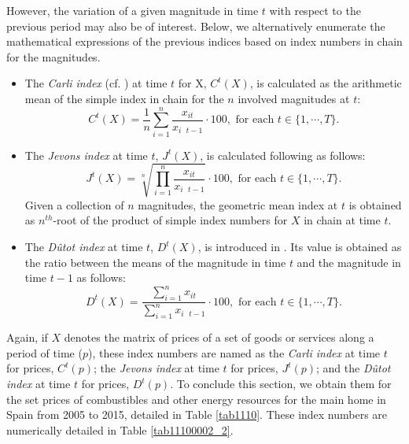 However,  the variation of a given magnitude in time $t$ with respect to  the previous period may also be  of interest. Below, we alternatively enumerate the mathematical  expressions of the previous indices based on index numbers in chain for the magnitudes.

\begin{itemize}
	\item The \emph{Carli index} (cf. \citealp{carli1804}) at time $t$ for X, $C^t(X)$, is calculated as the arithmetic mean of the simple index in chain for the $n$ involved magnitudes at $t$:
	\begin{equation}\label{niCarli}C^t(X)=\frac{1}{n}\sum_{i=1}^n \frac{x_{it}}{x_{i\mbox{ }t-1}}\cdot 100,\mbox{ for each }t\in\{1,\cdots,T\}.\end{equation}
	\item The \emph{Jevons index} at time $t$, $J^t(X)$, is calculated following \cite{jevons1863serious} as follows:
	\begin{equation}\label{niJevons}J^t(X)=\sqrt[n]{\prod_{i=1}^n \frac{x_{it}}{x_{i\mbox{ }t-1}}}\cdot 100,\mbox{ for each }t\in\{1,\cdots,T\}.\end{equation}
	Given a collection of $n$ magnitudes, the geometric mean index at $t$ is obtained as $n^{th}$-root of the product of simple index numbers for $X$ in chain at time $t$.
	\item The \emph{D\^utot index} at time $t$, $D^t(X)$, is introduced in \cite{de1754reflexions}. Its value is obtained as the ratio between the means of the magnitude in time $t$ and the magnitude in time $t-1$ as follows:
	\begin{equation}\label{niDutot}D^t(X)=\frac{\sum_{i=1}^n x_{it}}{\sum_{i=1}^n x_{i\mbox{ }t-1}}\cdot 100,\mbox{ for each }t\in\{1,\cdots,T\}.\end{equation}
\end{itemize}

Again, if $X$ denotes the matrix of prices of a set of goods or services along a period of time ($p$), these index numbers are named as the \emph{Carli index} at time $t$ for prices, $C^t(p)$; the \emph{Jevons index} at time $t$ for prices, $J^t(p)$; and the \emph{D\^utot index} at time $t$ for prices, $D^t(p)$. To conclude this section, we obtain them for the set prices of combustibles and other energy resources for the main home in Spain from 2005 to 2015, detailed in Table \ref{tab1110}. These index numbers are numerically detailed in Table \ref{tab11100002_2}.

